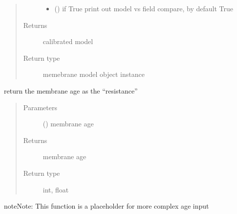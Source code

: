 \documentclass[letterpaper,10pt,english]{sphinxmanual}
\begin{document}
\begin{fulllineitems}
\begin{quote}
\begin{description}
\begin{itemize}
\item {} 
\sphinxAtStartPar
{} (\sphinxstyleliteralemphasis{\sphinxupquote{, }}) \textendash{} if True print out model vs field compare, by default True

\end{itemize}

\item[{Returns}] \leavevmode
\sphinxAtStartPar
calibrated model

\item[{Return type}] \leavevmode
\sphinxAtStartPar
memebrane model object instance

\end{description}\end{quote}

\end{fulllineitems}


\begin{fulllineitems}
\label{\detokenize{membrane:membrane.membrane_age}}
\sphinxAtStartPar
return the membrane age as the “resistance”
\begin{quote}\begin{description}
\item[{Parameters}] \leavevmode
\sphinxAtStartPar
{} (\sphinxstyleliteralemphasis{\sphinxupquote{, }}) \textendash{} membrane age

\item[{Returns}] \leavevmode
\sphinxAtStartPar
membrane age

\item[{Return type}] \leavevmode
\sphinxAtStartPar
int, float

\end{description}\end{quote}

\begin{sphinxadmonition}{note}{Note:}
\sphinxAtStartPar
This function is a placeholder for more complex age input
\end{sphinxadmonition}

\end{fulllineitems}
\end{document}
